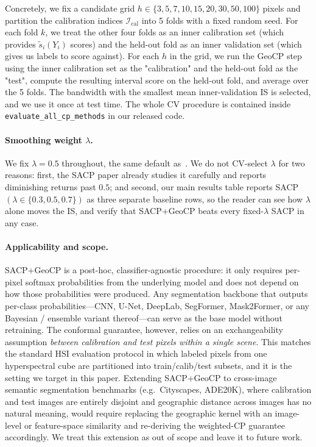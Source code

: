 \documentclass[11pt]{article}
\newcommand{\1}{\mathbf{1}}
\begin{document}
Concretely, we fix a candidate grid $h \in \{3, 5, 7, 10, 15, 20, 30, 50, 100\}$ pixels and partition the calibration indices $\mathcal{I}_{\text{cal}}$ into 5 folds with a fixed random seed. For each fold $k$, we treat the other four folds as an inner calibration set (which provides $\tilde s_i(Y_i)$ scores) and the held-out fold as an inner validation set (which gives us labels to score against). For each $h$ in the grid, we run the GeoCP step using the inner calibration set as the "calibration" and the held-out fold as the "test", compute the resulting interval score on the held-out fold, and average over the 5 folds. The bandwidth with the smallest mean inner-validation IS is selected, and we use it once at test time. The whole CV procedure is contained inside \texttt{evaluate\_all\_cp\_methods} in our released code.

\paragraph{Smoothing weight $\lambda$.} We fix $\lambda = 0.5$ throughout, the same default as~\citet{liu2024sacp}. We do not CV-select $\lambda$ for two reasons: first, the SACP paper already studies it carefully and reports diminishing returns past $0.5$; and second, our main results table reports SACP$(\lambda \in \{0.3, 0.5, 0.7\})$ as three separate baseline rows, so the reader can see how $\lambda$ alone moves the IS, and verify that SACP+GeoCP beats every fixed-$\lambda$ SACP in any case.

\paragraph{Applicability and scope.} SACP+GeoCP is a post-hoc, classifier-agnostic procedure: it only requires per-pixel softmax probabilities from the underlying model and does not depend on how those probabilities were produced. Any segmentation backbone that outputs per-class probabilities---CNN, U-Net, DeepLab, SegFormer, Mask2Former, or any Bayesian / ensemble variant thereof---can serve as the base model without retraining. The conformal guarantee, however, relies on an exchangeability assumption \emph{between calibration and test pixels within a single scene}. This matches the standard HSI evaluation protocol in which labeled pixels from one hyperspectral cube are partitioned into train/calib/test subsets, and it is the setting we target in this paper. Extending SACP+GeoCP to cross-image semantic segmentation benchmarks (e.g.\ Cityscapes, ADE20K), where calibration and test images are entirely disjoint and geographic distance across images has no natural meaning, would require replacing the geographic kernel with an image-level or feature-space similarity and re-deriving the weighted-CP guarantee accordingly. We treat this extension as out of scope and leave it to future work.
\end{document}
